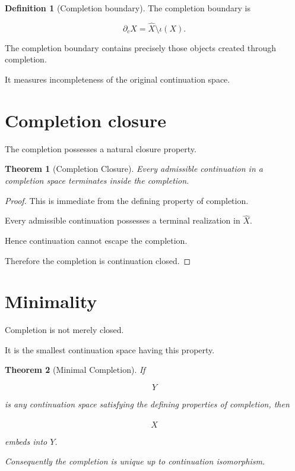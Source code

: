 \documentclass[13pt,openany]{book}
\theoremstyle{plain}
\newtheorem{theorem}{Theorem}[chapter]
\theoremstyle{definition}
\newtheorem{definition}{Definition}[chapter]
\begin{document}
\begin{definition}[Completion boundary]
The completion boundary is

\[
\partial_c X
=
\widehat X\setminus\iota(X).
\]
\end{definition}

The completion boundary contains precisely those objects created through
completion.

It measures incompleteness of the original continuation space.

\section{Completion closure}

The completion possesses a natural closure property.

\begin{theorem}[Completion Closure]
Every admissible continuation in a completion space terminates inside the
completion.
\end{theorem}

\begin{proof}
This is immediate from the defining property of completion.

Every admissible continuation possesses a terminal realization in
$\widehat X$.

Hence continuation cannot escape the completion.

Therefore the completion is continuation closed.
\end{proof}

\section{Minimality}

Completion is not merely closed.

It is the smallest continuation space having this property.

\begin{theorem}[Minimal Completion]
If

\[
Y
\]

is any continuation space satisfying the defining properties of completion,
then

\[
\widehat X
\]

embeds into $Y$.

Consequently the completion is unique up to continuation isomorphism.
\end{theorem}
\end{document}
